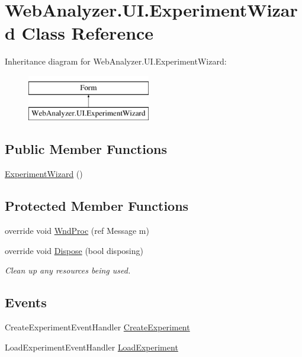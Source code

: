 \hypertarget{class_web_analyzer_1_1_u_i_1_1_experiment_wizard}{}\section{Web\+Analyzer.\+U\+I.\+Experiment\+Wizard Class Reference}
\label{class_web_analyzer_1_1_u_i_1_1_experiment_wizard}
Inheritance diagram for Web\+Analyzer.\+U\+I.\+Experiment\+Wizard\+:\begin{figure}[H]
\begin{center}
\leavevmode
\includegraphics[height=2.000000cm]{class_web_analyzer_1_1_u_i_1_1_experiment_wizard}
\end{center}
\end{figure}
\subsection*{Public Member Functions}
\begin{DoxyCompactItemize}
\item 
\hyperlink{class_web_analyzer_1_1_u_i_1_1_experiment_wizard_adf341f79a31a375235d7afa3abf63030}{Experiment\+Wizard} ()
\end{DoxyCompactItemize}
\subsection*{Protected Member Functions}
\begin{DoxyCompactItemize}
\item 
override void \hyperlink{class_web_analyzer_1_1_u_i_1_1_experiment_wizard_a96ad3b4f335a244f83f0c09636523989}{Wnd\+Proc} (ref Message m)
\item 
override void \hyperlink{class_web_analyzer_1_1_u_i_1_1_experiment_wizard_a15f391a3ce1d14428480cbf98d7ed043}{Dispose} (bool disposing)
\begin{DoxyCompactList}\small\item\em Clean up any resources being used. \end{DoxyCompactList}\end{DoxyCompactItemize}
\subsection*{Events}
\begin{DoxyCompactItemize}
\item 
Create\+Experiment\+Event\+Handler \hyperlink{class_web_analyzer_1_1_u_i_1_1_experiment_wizard_ac18185c9d12c074d2b82c2426e545461}{Create\+Experiment}
\item 
Load\+Experiment\+Event\+Handler \hyperlink{class_web_analyzer_1_1_u_i_1_1_experiment_wizard_ad469bc433ee12cf551309f1b2ab37e65}{Load\+Experiment}
\end{DoxyCompactItemize}
